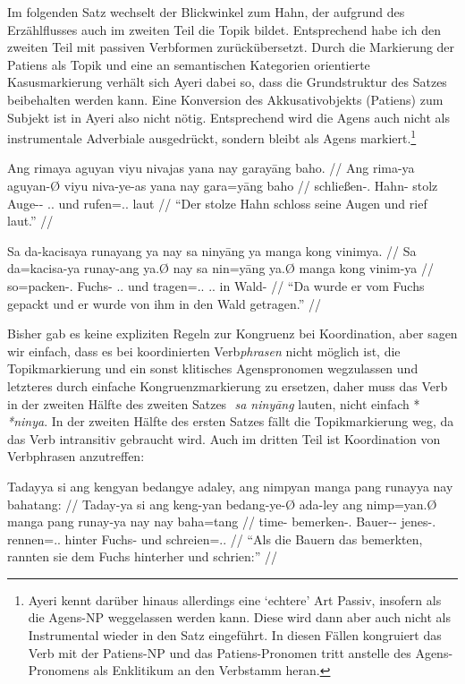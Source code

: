\documentclass[12pt,paper=a4]{scrartcl}
\newcommand{\PargI}{{\Parg}.{\Inan}}
\newcommand{\TsgM}{{\Tsg}.{\M}}
\newcommand{\TplM}{{\Tpl}.{\M}}
\newcommand{\zwsp}{\mbox{​}} %
\newcommand{\rayr}[2]{\zwsp\smash{{\Tagati #1}} \emph{#2}} %
\begin{document}
Im folgenden Satz wechselt der Blickwinkel zum Hahn, der aufgrund des Erzählflusses auch im zweiten Teil die Topik bildet. Entsprechend habe ich den zweiten Teil mit passiven Verbformen zurückübersetzt. Durch die Markierung der Patiens als Topik und eine an semantischen Kategorien orientierte Kasusmarkierung verhält sich Ayeri dabei so, dass die Grundstruktur des Satzes beibehalten werden kann. Eine Konversion des Akkusativobjekts (Patiens) zum Subjekt ist in Ayeri also nicht nötig. Entsprechend wird die Agens auch nicht als instrumentale Adverbiale ausgedrückt, sondern bleibt als Agens markiert.\footnote{Ayeri kennt darüber hinaus allerdings eine \enquote*{echtere} Art Passiv, insofern als die Agens-NP weggelassen werden kann. Diese wird dann aber auch nicht als Instrumental wieder in den Satz eingeführt. In diesen Fällen kongruiert das Verb mit der Patiens-NP und das Patiens-Pronomen tritt anstelle des Agens-Pronomens als Enklitikum an den Verbstamm heran.}

\pex %
\a\begingl
	\gla Ang rimaya aguyan viyu nivajas yana nay garayāng baho. //
	\glb Ang rima-ya aguyan-Ø viyu niva-ye-as yana nay gara=yāng baho //
	\glc \AgtT{} schließen-\TsgM{} Hahn-\Top{} stolz Auge-\Pl{}-\Parg{} \TsgM{}.\Gen{} und rufen=\TsgM{}.\Aarg{} laut //
	\glft \enquote{Der stolze Hahn schloss seine Augen und rief laut.} //
\endgl

\a\begingl
	\gla Sa da-kacisaya runayang ya nay sa ninyāng ya manga kong vinimya. //
	\glb Sa da=kacisa-ya runay-ang ya.Ø nay sa nin=yāng ya.Ø manga kong vinim-ya //
	\glc \PatT{} so=packen-\TsgM{} Fuchs-\Aarg{} \TsgM{}.\Top{} und \PatT{} tragen=\TsgM{}.\Aarg{} \TsgM{}.\Top{} \Dyn{} in Wald-\Loc{} //
	\glft \enquote{Da wurde er vom Fuchs gepackt und er wurde von ihm in den Wald getragen.} //
\endgl

\xe

Bisher gab es keine expliziten Regeln zur Kongruenz bei Koordination, aber sagen wir einfach, dass es bei koordinierten Verb\emph{phrasen} nicht möglich ist, die Topikmarkierung und ein sonst klitisches Agenspronomen wegzulassen und letzteres durch einfache Kongruenzmarkierung zu ersetzen, daher muss das Verb in der zweiten Hälfte des zweiten Satzes \rayr{s ninFyaaNF}{sa ninyāng} lauten, nicht einfach *\rayr{ninY}{*ninya}. In der zweiten Hälfte des ersten Satzes fällt die Topikmarkierung weg, da das Verb intransitiv gebraucht wird. Auch im dritten Teil ist Koordination von Verbphrasen anzutreffen:

\pex %
\a\begingl
	\gla Tadayya si ang kengyan bedangye adaley, ang nimpyan manga pang runayya nay bahatang: //
	\glb Taday-ya si ang keng-yan bedang-ye-Ø ada-ley ang nimp=yan.Ø manga pang runay-ya nay nay baha=tang //
	\glc time-\Loc{} \Rel{} \AgtT{} bemerken-\TplM{} Bauer-\Pl{}-\Top{} jenes-\PargI{} \AgtT{} rennen=\TplM{}.\Top{} \Dyn{} hinter Fuchs-\Loc{} und schreien=\TplM{}.\Aarg{} //
	\glft \enquote{Als die Bauern das bemerkten, rannten sie dem Fuchs hinterher und schrien:} //
\endgl
\end{document}
